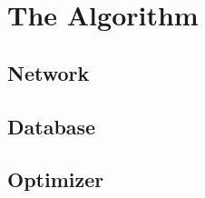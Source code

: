 \section{The Algorithm}



\subsection{Network} \label{sec:NN}

\newpage

\subsection{Database} \label{sec:DB}

\newpage

\subsection{Optimizer} \label{sec:opt}

